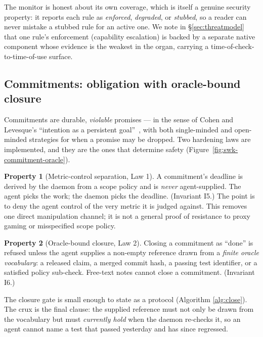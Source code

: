 \documentclass[11pt,a4paper]{article}
\theoremstyle{definition}
\newtheorem{property}{Property}[section]
\theoremstyle{remark}
\begin{document}
The monitor is honest about its own coverage, which is itself a genuine security
property: it reports each rule as \emph{enforced}, \emph{degraded}, or
\emph{stubbed}, so a reader can never mistake a stubbed rule for an active one. We
note in \S\ref{sec:threatmodel} that one rule's enforcement (capability escalation)
is backed by a separate native component whose evidence is the weakest in the
organ, carrying a time-of-check-to-time-of-use surface.

\subsection{Commitments: obligation with oracle-bound closure}



Commitments are durable, \emph{violable} promises --- in the sense of Cohen and
Levesque's ``intention as a persistent goal''~\cite{cohenlevesque1990}, with both
single-minded and open-minded strategies for when a promise may be dropped. Two
hardening laws are implemented, and they are the ones that determine safety
(Figure~\ref{fig:swk-commitment-oracle}).

\begin{property}[Metric-control separation, Law 1]\label{prop:law1}
A commitment's deadline is derived by the daemon from a scope policy and is
\emph{never} agent-supplied. The agent picks the work; the daemon picks the
deadline. (Invariant I5.) The point is to deny the agent control of the very metric
it is judged against. This removes one direct manipulation channel; it is not a
general proof of resistance to proxy gaming or misspecified scope policy.
\end{property}

\begin{property}[Oracle-bound closure, Law 2]\label{prop:law2}
Closing a commitment as ``done'' is refused unless the agent supplies a non-empty
reference drawn from a \emph{finite oracle vocabulary}: a released claim, a merged
commit hash, a passing test identifier, or a satisfied policy sub-check. Free-text
notes cannot close a commitment. (Invariant I6.)
\end{property}

The closure gate is small enough to state as a protocol (Algorithm
\ref{alg:close}). The crux is the final clause: the supplied reference must not only
be drawn from the vocabulary but must \emph{currently hold} when the daemon
re-checks it, so an agent cannot name a test that passed yesterday and has since
regressed.
\end{document}
